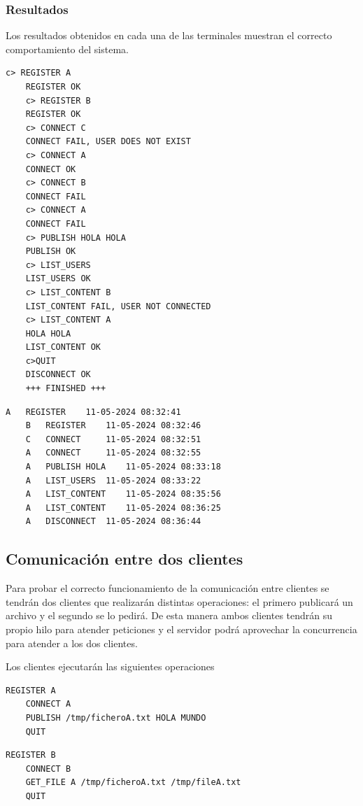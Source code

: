 \documentclass[]{article}
\begin{document}
\subsubsection{Resultados}
\label{subsubsection:resultados_1_cliente}
Los resultados obtenidos en cada una de las terminales muestran el correcto comportamiento del sistema.
\begin{lstlisting}[caption=Resultados obtenidos en el cliente]
    c> REGISTER A
    REGISTER OK
    c> REGISTER B
    REGISTER OK
    c> CONNECT C
    CONNECT FAIL, USER DOES NOT EXIST
    c> CONNECT A
    CONNECT OK
    c> CONNECT B
    CONNECT FAIL
    c> CONNECT A
    CONNECT FAIL
    c> PUBLISH HOLA HOLA
    PUBLISH OK 
    c> LIST_USERS
    LIST_USERS OK
    c> LIST_CONTENT B
    LIST_CONTENT FAIL, USER NOT CONNECTED
    c> LIST_CONTENT A
    HOLA HOLA
    LIST_CONTENT OK
    c>QUIT
    DISCONNECT OK
    +++ FINISHED +++
\end{lstlisting}

\begin{lstlisting}[caption=Impresiones del servidor RPC]
    A	REGISTER	11-05-2024 08:32:41
    B	REGISTER	11-05-2024 08:32:46
    C	CONNECT	    11-05-2024 08:32:51
    A	CONNECT	    11-05-2024 08:32:55
    A	PUBLISH HOLA	11-05-2024 08:33:18
    A	LIST_USERS	11-05-2024 08:33:22
    A	LIST_CONTENT	11-05-2024 08:35:56
    A	LIST_CONTENT	11-05-2024 08:36:25
    A	DISCONNECT	11-05-2024 08:36:44
\end{lstlisting}

\subsection{Comunicación entre dos clientes}
\label{subsection:2_clientes}
Para probar el correcto funcionamiento de la comunicación entre clientes se tendrán dos clientes que realizarán distintas operaciones: el primero publicará un archivo y el segundo se lo pedirá.
De esta manera ambos clientes tendrán su propio hilo para atender peticiones y el servidor podrá aprovechar la concurrencia para atender a los dos clientes.

Los clientes ejecutarán las siguientes operaciones
\begin{lstlisting}[caption=Operaciones a realizar por el cliente A]
    REGISTER A
    CONNECT A
    PUBLISH /tmp/ficheroA.txt HOLA MUNDO
    QUIT
\end{lstlisting}
\begin{lstlisting}[caption=Operaciones a realizar por el cliente B]
    REGISTER B
    CONNECT B
    GET_FILE A /tmp/ficheroA.txt /tmp/fileA.txt
    QUIT
\end{lstlisting}
\end{document}
